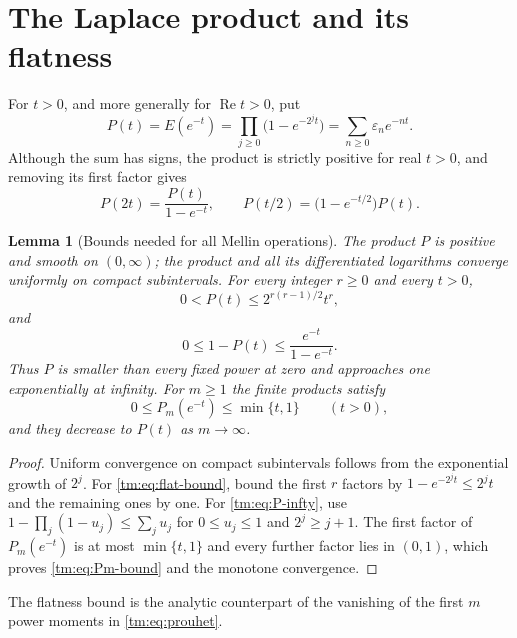 \documentclass[11pt,a4paper,oneside,openany]{book}
\numberwithin{equation}{chapter}
\newtheorem{lemma}[theorem]{Lemma}
\theoremstyle{definition}
\theoremstyle{remark}
\newcommand{\eps}{\varepsilon}
\DeclareMathOperator{\Rea}{Re}
\begin{document}
\section{The Laplace product and its flatness}
For $t>0$, and more generally for $\Rea t>0$, put
\begin{equation}\label{tm:eq:P-def}
 P(t)=E(e^{-t})=\prod_{j\ge0}\bigl(1-e^{-2^jt}\bigr)
     =\sum_{n\ge0}\eps_ne^{-nt}.
\end{equation}
Although the sum has signs, the product is strictly positive for real
$t>0$, and removing its first factor gives
\begin{equation}\label{tm:eq:P-mahler}
 P(2t)=\frac{P(t)}{1-e^{-t}},\qquad
 P(t/2)=\bigl(1-e^{-t/2}\bigr)P(t).
\end{equation}

\begin{lemma}[Bounds needed for all Mellin operations]\label{tm:lem:P-bounds}
The product $P$ is positive and smooth on $(0,\infty)$; the product and all
its differentiated logarithms converge uniformly on compact subintervals.
For every integer $r\ge0$ and every $t>0$,
\begin{equation}\label{tm:eq:flat-bound}
 0<P(t)\le2^{r(r-1)/2}t^r,
\end{equation}
and
\begin{equation}\label{tm:eq:P-infty}
 0\le1-P(t)\le\frac{e^{-t}}{1-e^{-t}}.
\end{equation}
Thus $P$ is smaller than every fixed power at zero and approaches one
exponentially at infinity. For $m\ge1$ the finite products satisfy
\begin{equation}\label{tm:eq:Pm-bound}
 0\le P_m(e^{-t})\le\min\{t,1\}\qquad(t>0),
\end{equation}
and they decrease to $P(t)$ as $m\to\infty$.
\end{lemma}
\begin{proof}
Uniform convergence on compact subintervals follows from the exponential
growth of $2^j$. For \eqref{tm:eq:flat-bound}, bound the first $r$ factors
by $1-e^{-2^jt}\le2^jt$ and the remaining ones by one. For
\eqref{tm:eq:P-infty}, use $1-\prod_j(1-u_j)\le\sum_ju_j$ for $0\le u_j\le1$
and $2^j\ge j+1$. The first factor of $P_m(e^{-t})$ is at most
$\min\{t,1\}$ and every further factor lies in $(0,1)$, which proves
\eqref{tm:eq:Pm-bound} and the monotone convergence.
\end{proof}
The flatness bound is the analytic counterpart of the vanishing of the
first $m$ power moments in \eqref{tm:eq:prouhet}.
\end{document}
